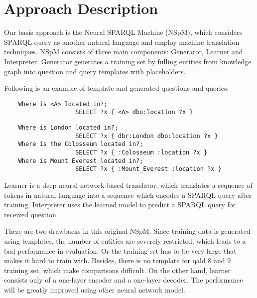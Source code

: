 
\section{Approach Description}

Our basis approach is the Neural SPARQL Machine (NSpM)\cite{soru-marx-nampi2018},
which considers SPARQL query as another natural language and employ machine translation techniques. 
NSpM consists of three main components: 
Generator, Learner and Interpreter. 
Generator generates a training set
by fulling entities from knowledge graph into question and query templates with placeholders. 

Following is an example of template and generated questions and queries:

\begin{verbatim}
    Where is <A> located in?; 
                    SELECT ?x { <A> dbo:location ?x }
\end{verbatim}

\begin{verbatim}
    Where is London located in?; 
                    SELECT ?x { dbr:London dbo:location ?x }
    Where is the Colosseum located in?; 
                    SELECT ?x { :Colosseum :location ?x }
    Where is Mount Everest located in?; 
                    SELECT ?x { :Mount_Everest :location ?x }
\end{verbatim}

Learner is a deep neural network based translator, 
which translates a sequence of tokens in natural language
into a sequence which encodes a SPARQL query after training.
Interpreter uses the learned model to predict a SPARQL query for received question.

There are two drawbacks in this original NSpM.
Since training data is generated using templates, 
the number of entities are severely restricted,
which leads to a bad performance in evaluation.
Or the training set has to be very large
that makes it hard to train with. 
Besides, there is no template for qald 8 and 9 training set,
which make comparisons difficult. 
On the other hand, 
learner consists only of a one-layer encoder and a one-layer decoder.
The performance will be greatly improved using other neural network model. 




